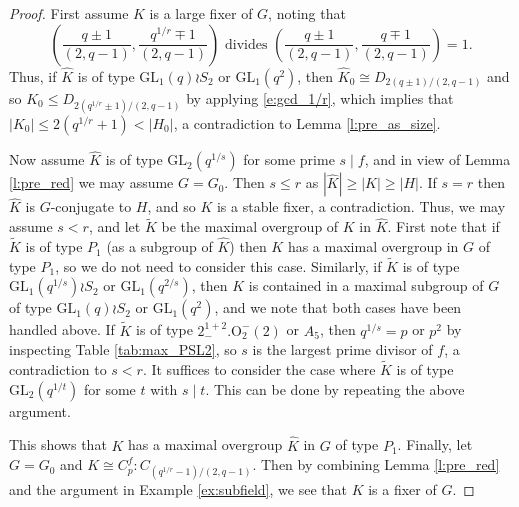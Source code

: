 \documentclass[twoside,a4paper,reqno,11pt]{amsart}
\newcommand{\<}{\langle}
\renewcommand{\>}{\rangle}
\newcommand{\leqs}{\leqslant}
\newcommand{\geqs}{\geqslant}
\newcommand{\GL}{\mathrm{GL}}
\theoremstyle{definition}
\begin{document}
	\begin{proof}
		First assume $K$ is a large fixer of $G$, noting that
		\begin{equation}
		\label{e:gcd_1/r}
		\left(\frac{q\pm 1}{(2,q-1)},\frac{q^{1/r}\mp 1}{(2,q-1)}\right)\text{ divides }\left(\frac{q\pm 1}{(2,q-1)},\frac{q\mp 1}{(2,q-1)}\right) = 1.
		\end{equation}
		Thus, if $\widehat{K}$ is of type $\GL_1(q)\wr S_2$ or $\GL_1(q^2)$, then $\widehat{K}_0 \cong D_{2(q\pm 1)/(2,q-1)}$ and so $K_0\leqs D_{2(q^{1/r}\pm 1)/(2,q-1)}$ by applying \eqref{e:gcd_1/r}, which implies that $|K_0|\leqs 2(q^{1/r}+1) < |H_0|$, a contradiction to Lemma \ref{l:pre_as_size}.
		
		Now assume $\widehat{K}$ is of type $\GL_2(q^{1/s})$ for some prime $s\mid f$, and in view of Lemma \ref{l:pre_red} we may assume $G = G_0$. Then $s\leqs r$ as $|\widehat{K}|\geqs|K|\geqs|H|$. If $s = r$ then $\widehat{K}$ is $G$-conjugate to $H$, and so $K$ is a stable fixer, a contradiction. Thus, we may assume $s < r$, and let $\widetilde{K}$ be the maximal overgroup of $K$ in $\widehat{K}$. First note that if $\widetilde{K}$ is of type $P_1$ (as a subgroup of $\widehat{K}$) then $K$ has a maximal overgroup in $G$ of type $P_1$, so we do not need to consider this case. Similarly, if $\widetilde{K}$ is of type $\GL_1(q^{1/s})\wr S_2$ or $\GL_1(q^{2/s})$, then $K$ is contained in a maximal subgroup of $G$ of type $\GL_1(q)\wr S_2$ or $\GL_1(q^2)$, and we note that both cases have been handled above. If $\widetilde{K}$ is of type $2_-^{1+2}.\mathrm{O}_2^-(2)$ or $A_5$, then $q^{1/s} = p$ or $p^2$ by inspecting Table \ref{tab:max_PSL2}, so $s$ is the largest prime divisor of $f$, a contradiction to $s<r$. It suffices to consider the case where $\widetilde{K}$ is of type $\GL_2(q^{1/t})$ for some $t$ with $s\mid t$. This can be done by repeating the above argument.
		
		This shows that $K$ has a maximal overgroup $\widehat{K}$ in $G$ of type $P_1$. Finally, let $G = G_0$ and $K\cong C_p^f{:}C_{(q^{1/r}-1)/(2,q-1)}$. Then by combining Lemma \ref{l:pre_red} and the argument in Example \ref{ex:subfield}, we see that $K$ is a fixer of $G$. %
	\end{proof}
	
\end{document}
